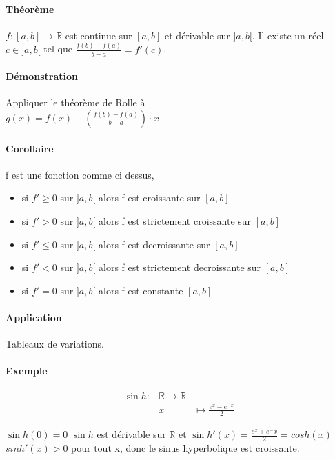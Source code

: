 \paragraph{Théorème} $f:[a, b] \rightarrow \mathbb{R}$ est continue sur $[a, b]$ et dérivable sur $]a, b[$.
Il existe un réel $c \in ]a, b[$ tel que $\frac{f(b)-f(a)}{b-a} = f'(c)$.

\paragraph{Démonstration} Appliquer le théorème de Rolle à  ~\\
$g(x) = f(x) - (\frac{f(b)-f(a)}{b-a})\cdot x$

\paragraph{Corollaire} f est une fonction comme ci dessus, 

\begin{itemize}
\item si $f' \geq 0$ sur $]a, b[$ alors f est croissante sur $[a, b]$
\item si $f' > 0$ sur $]a, b[$ alors f est strictement croissante sur $[a, b]$
\item si $f' \leq 0$ sur $]a, b[$ alors f est decroissante sur $[a, b]$
\item si $f' < 0$ sur $]a, b[$ alors f est strictement decroissante sur $[a, b]$
\item si $f' = 0$ sur $]a, b[$ alors f est constante $[a, b]$
\end{itemize}

\paragraph{Application} Tableaux de variations.

\paragraph{Exemple} \[
\begin{array}{rcl}
\sin h :& \mathbb{R} \rightarrow \mathbb{R} \\
&x& \mapsto \frac{e^x - e^{-x}}{2}
\end{array}\]

$\sin h (0) = 0$ $\sin h$ est dérivable sur $\mathbb{R}$ et $\sin h'(x) = \frac{e^x + e^-x}{2} = cos h(x)$ ~\\
$sinh'(x) > 0$ pour tout x, donc le sinus hyperbolique est croissante.

